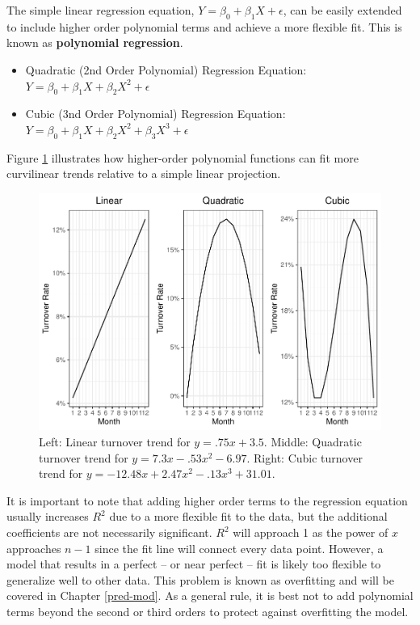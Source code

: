 \documentclass[
]{book}
\providecommand{\tightlist}{%
  \setlength{\itemsep}{0pt}\setlength{\parskip}{0pt}}
\begin{document}
The simple linear regression equation, \(Y = \beta_0 + \beta_1 X + \epsilon\), can be easily extended to include higher order polynomial terms and achieve a more flexible fit. This is known as \textbf{polynomial regression}.

\begin{itemize}
\tightlist
\item
  Quadratic (2nd Order Polynomial) Regression Equation: \(Y = \beta_0 + \beta_1 X + \beta_2 X^2 + \epsilon\)
\item
  Cubic (3nd Order Polynomial) Regression Equation: \(Y = \beta_0 + \beta_1 X + \beta_2 X^2 + \beta_3 X^3 + \epsilon\)
\end{itemize}

Figure \ref{fig:poly-fun} illustrates how higher-order polynomial functions can fit more curvilinear trends relative to a simple linear projection.

\begin{figure}

{\centering \includegraphics[width=1\linewidth]{The_Fundamentals_of_People_Analytics_files/figure-latex/poly-fun-1} 

}

\caption{Left: Linear turnover trend for $y = .75x + 3.5$. Middle: Quadratic turnover trend for $y = 7.3x - .53x^2 - 6.97$. Right: Cubic turnover trend for $y = -12.48x + 2.47x^2 - .13x^3 + 31.01$.}\label{fig:poly-fun}
\end{figure}

It is important to note that adding higher order terms to the regression equation usually increases \(R^2\) due to a more flexible fit to the data, but the additional coefficients are not necessarily significant. \(R^2\) will approach 1 as the power of \(x\) approaches \(n-1\) since the fit line will connect every data point. However, a model that results in a perfect -- or near perfect -- fit is likely too flexible to generalize well to other data. This problem is known as overfitting and will be covered in Chapter \ref{pred-mod}. As a general rule, it is best not to add polynomial terms beyond the second or third orders to protect against overfitting the model.
\end{document}
